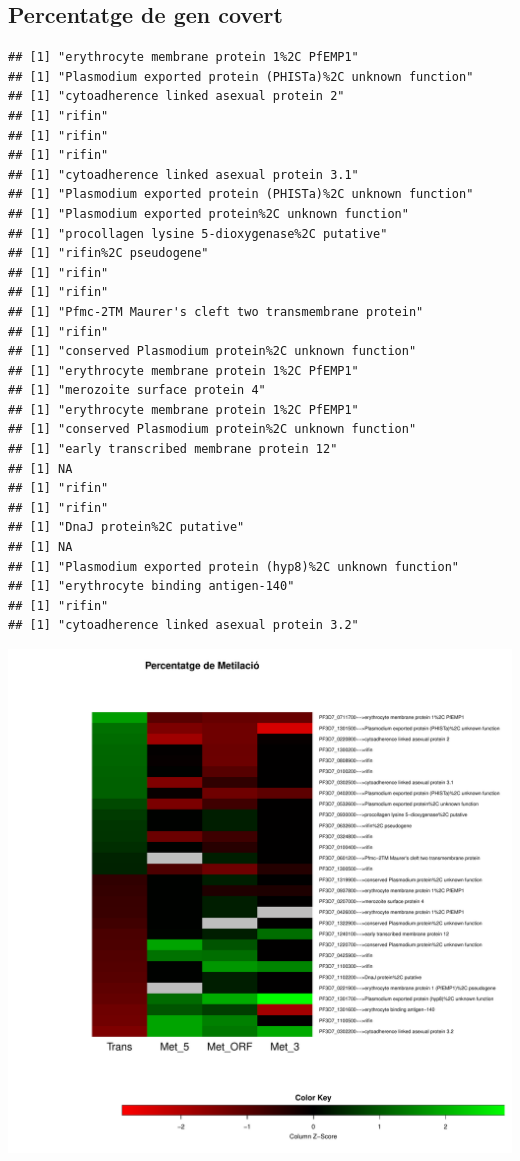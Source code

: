 \documentclass{article}\usepackage[]{graphicx}\usepackage[]{color}
\makeatletter
\newenvironment{kframe}{%
 \def\at@end@of@kframe{}%
 \ifinner\ifhmode%
  \def\at@end@of@kframe{\end{minipage}}%
  \begin{minipage}{\columnwidth}%
 \fi\fi%
 \def\FrameCommand##1{\hskip\@totalleftmargin \hskip-\fboxsep
 \colorbox{shadecolor}{##1}\hskip-\fboxsep
     \hskip-\linewidth \hskip-\@totalleftmargin \hskip\columnwidth}%
 \MakeFramed {\advance\hsize-\width
   \@totalleftmargin\z@ \linewidth\hsize
   \@setminipage}}%
 {\par\unskip\endMakeFramed%
 \at@end@of@kframe}
\newenvironment{knitrout}{}{} %
\makeatother
\begin{document}
\subsection{Percentatge de gen covert}
\begin{knitrout}
\color{fgcolor}\begin{kframe}
\begin{verbatim}
## [1] "erythrocyte membrane protein 1%2C PfEMP1"
## [1] "Plasmodium exported protein (PHISTa)%2C unknown function"
## [1] "cytoadherence linked asexual protein 2"
## [1] "rifin"
## [1] "rifin"
## [1] "rifin"
## [1] "cytoadherence linked asexual protein 3.1"
## [1] "Plasmodium exported protein (PHISTa)%2C unknown function"
## [1] "Plasmodium exported protein%2C unknown function"
## [1] "procollagen lysine 5-dioxygenase%2C putative"
## [1] "rifin%2C pseudogene"
## [1] "rifin"
## [1] "rifin"
## [1] "Pfmc-2TM Maurer's cleft two transmembrane protein"
## [1] "rifin"
## [1] "conserved Plasmodium protein%2C unknown function"
## [1] "erythrocyte membrane protein 1%2C PfEMP1"
## [1] "merozoite surface protein 4"
## [1] "erythrocyte membrane protein 1%2C PfEMP1"
## [1] "conserved Plasmodium protein%2C unknown function"
## [1] "early transcribed membrane protein 12"
## [1] NA
## [1] "rifin"
## [1] "rifin"
## [1] "DnaJ protein%2C putative"
## [1] NA
## [1] "Plasmodium exported protein (hyp8)%2C unknown function"
## [1] "erythrocyte binding antigen-140"
## [1] "rifin"
## [1] "cytoadherence linked asexual protein 3.2"
\end{verbatim}
\end{kframe}

{\centering \includegraphics[width=.9\linewidth]{figure/minimal-trans_percent-1} 

}



\end{knitrout}
\clearpage
\end{document}
